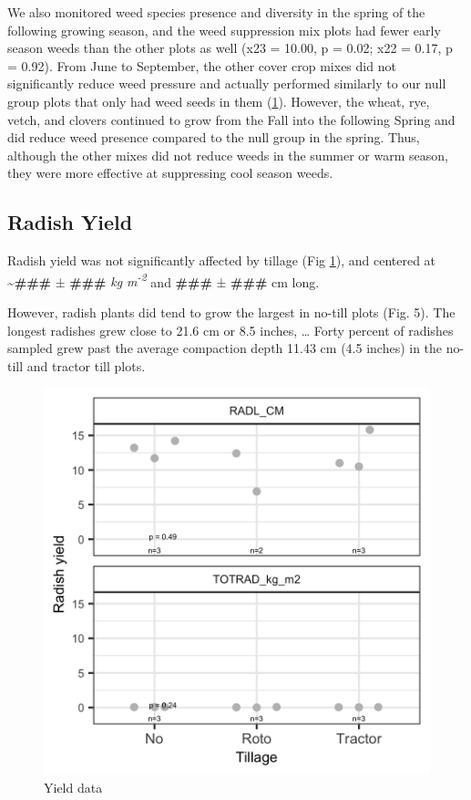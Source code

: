 \documentclass[
]{article}
\begin{document}
We also monitored weed species presence and diversity in the spring of the following growing season, and the weed suppression mix plots had fewer early season weeds than the other plots as well (x23 = 10.00, p = 0.02; x22 = 0.17, p = 0.92).
From June to September, the other cover crop mixes did not significantly reduce weed pressure and actually performed similarly to our null group plots that only had weed seeds in them (\ref{fig:yieldFig}).
However, the wheat, rye, vetch, and clovers continued to grow from the Fall into the following Spring and did reduce weed presence compared to the null group in the spring.
Thus, although the other mixes did not reduce weeds in the summer or warm season, they were more effective at suppressing cool season weeds.

\hypertarget{radish-yield}{%
\subsection{Radish Yield}\label{radish-yield}}

Radish yield was not significantly affected by tillage (Fig \ref{fig:yieldFig}), and centered at \textasciitilde{}\textbf{\#\#\#} ± \textbf{\#\#\#} \emph{kg m\textsuperscript{-2}} and \textbf{\#\#\#} ± \textbf{\#\#\#} cm long.

However, radish plants did tend to grow the largest in no-till plots (Fig. 5). The longest radishes grew close to 21.6 cm or 8.5 inches, \ldots{} Forty percent of radishes sampled grew past the average compaction depth 11.43 cm (4.5 inches) in the no-till and tractor till plots.

\begin{figure}
\includegraphics[width=12.5in]{../figs/yieldPlot} \caption{Yield data}\label{fig:yieldFig}
\end{figure}
\end{document}
